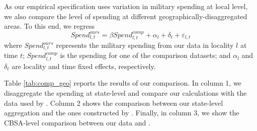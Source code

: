 \documentclass[dv_diss_main.tex]{subfiles}
\begin{document}
As our empirical specification uses variation in military spending at local level, we also compare the level of spending at different geographically-disaggregated areas. To this end, we regress
\begin{equation*}
    Spend^{ours}_{l,t} = \beta Spend^{comp}_{l,t} + \alpha_l + \delta_{t} + \varepsilon_{l,t}
\end{equation*}
where $Spend^{ours}_{l,t}$ represents the military spending from our data in locality $l$ at time $t$; $Spend^{comp}_{l,t}$ is the spending for one of the comparison datasets; and $\alpha_l$ and $\delta_{t}$ are locality and time fixed effects, respectively.

Table \ref{tab:comp_geo} reports the results of our comparison. In column 1, we disaggregate the spending at state-level and compare our calculations with the data used by \cite{Nakamura2014}. Column 2 shows the comparison between our state-level aggregation and the ones constructed by \cite{Dupor2017}. Finally, in column 3, we show the CBSA-level comparison between our data and \cite{Demyanyk2019}.
\end{document}
